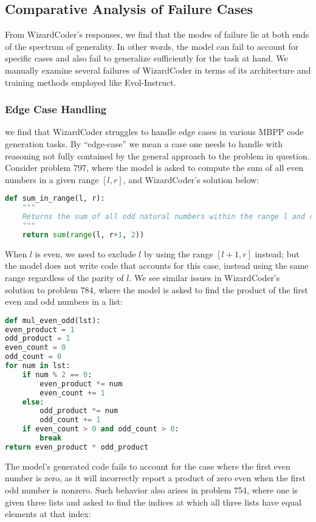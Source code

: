 \documentclass[10pt]{article}
\theoremstyle{definition}
\begin{document}
\subsection{Comparative Analysis of Failure Cases}
\noindent From WizardCoder's responses, we find that the modes of failure lie at both ends of the spectrum of generality. In other words, the model can fail to account for specific cases and also fail to generalize sufficiently for the task at hand. We manually examine several failures of WizardCoder in terms of its architecture and training methods employed like Evol-Instruct. 

\subsubsection{Edge Case Handling}
\noindent we find that WizardCoder struggles to handle edge cases in various MBPP code generation tasks. By ``edge-case'' we mean a case one needs to handle with reasoning not fully contained by the general approach to the problem in question. Consider problem 797, where the model is asked to compute the sum of all even numbers in a given range $[l, r]$, and WizardCoder's solution below:
\begin{lstlisting}[language=Python]
def sum_in_range(l, r):
    """
    Returns the sum of all odd natural numbers within the range l and r (inclusive).
    """
    return sum(range(l, r+1, 2))
\end{lstlisting}
\noindent When $l$ is even, we need to exclude $l$ by using the range $[l+1, r]$ instead; but the model does not write code that accounts for this case, instead using the same range regardless of the parity of $l$. We see similar issues in WizardCoder's solution to problem 784, where the model is asked to find the product of the first even and odd numbers in a list:
\begin{lstlisting}[language=Python]
def mul_even_odd(lst):
even_product = 1
odd_product = 1
even_count = 0
odd_count = 0
for num in lst:
    if num % 2 == 0:
        even_product *= num
        even_count += 1
    else:
        odd_product *= num
        odd_count += 1
    if even_count > 0 and odd_count > 0:
        break
return even_product * odd_product
\end{lstlisting}
\noindent The model's generated code fails to account for the case where the first even number is zero, as it will incorrectly report a product of zero even when the first odd number is nonzero. Such behavior also arises in problem 754, where one is given three lists and asked to find the indices at which all three lists have equal elements at that index:
\end{document}

